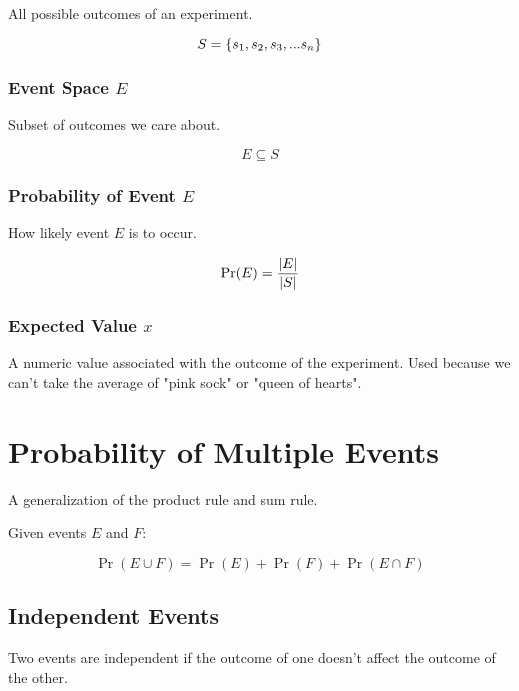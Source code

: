 \documentclass{report}
\DeclarePairedDelimiter{\card}{\lvert}{\rvert}
\DeclarePairedDelimiter{\makeset}{\{}{\}}
\DeclareMathOperator{\prob}{Pr}
\begin{document}
All possible outcomes of an experiment.

\begin{equation}
    S = \makeset{s_1, s_2, s_3, ... s_n}
\end{equation}

\subsubsection{Event Space $E$}

Subset of outcomes we care about.

\begin{equation}
    E \subseteq S
\end{equation}

\subsubsection{Probability of Event $E$}

How likely event $E$ is to occur.

\begin{equation}
    \prob(E) = \frac{\card{E}}{\card{S}}
\end{equation}

\subsubsection{Expected Value $x$}

A numeric value associated with the outcome of the experiment. Used because we can't take the average of "pink sock" or "queen of hearts".

\section{Probability of Multiple Events}

A generalization of the product rule and sum rule.

Given events $E$ and $F$:

\begin{equation}
    \prob(E \cup F) = \prob(E) + \prob(F) + \prob(E \cap F)
\end{equation}

\subsection{Independent Events}

Two events are independent if the outcome of one doesn't affect the outcome of the other.
\end{document}

